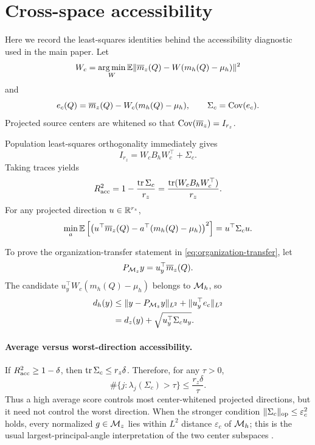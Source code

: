 \section{Cross-space accessibility}\label{app:accessibility}

Here we record the least-squares identities behind the accessibility diagnostic
used in the main paper. Let
\[
W_c
=
\operatorname*{arg\,min}_W
\mathbb{E}\lVert 
\overline m_z(Q)-W(m_h(Q)-\mu_h)
\rVert^2
\]
and
\[
e_c(Q)
=
\overline m_z(Q)-W_c(m_h(Q)-\mu_h),
\qquad
\Sigma_c=\operatorname{Cov}(e_c).
\]
Projected source centers are whitened so that
$\operatorname{Cov}(\overline m_z)=I_{r_z}$.

Population least-squares orthogonality immediately gives
\begin{equation}\label{eq:access-cov-decomp-app}
I_{r_z}
=
W_cB_hW_c^\top+\Sigma_c.
\end{equation}
Taking traces yields
\[
R^2_{\rm acc}
=
1-\frac{\operatorname{tr}\Sigma_c}{r_z}
=
\frac{\operatorname{tr}(W_cB_hW_c^\top)}{r_z}.
\]
For any projected direction $u\in\mathbb{R}^{r_z}$,
\begin{equation}\label{eq:directional-access-app}
\min_a
\mathbb{E}\left[
\left(
u^\top\overline m_z(Q)
-
a^\top(m_h(Q)-\mu_h)
\right)^2
\right]
=
u^\top\Sigma_cu.
\end{equation}

To prove the organization-transfer statement in
\eqref{eq:organization-transfer}, let
\[
P_{\mathcal{M}_z}y=u_y^\top\overline m_z(Q).
\]
The candidate
$u_y^\top W_c(m_h(Q)-\mu_h)$ belongs to $\mathcal{M}_h$, so
\[
\begin{aligned}
d_h(y)
&\le
\lVert y-P_{\mathcal{M}_z}y\rVert_{L^2}
+
\lVert u_y^\top e_c\rVert_{L^2}\\
&=
d_z(y)+\sqrt{u_y^\top\Sigma_cu_y}.
\end{aligned}
\]

\paragraph{Average versus worst-direction accessibility.}
If $R^2_{\rm acc}\ge1-\delta$, then
$\operatorname{tr}\Sigma_c\le r_z\delta$. Therefore, for any $\tau>0$,
\[
\#\{j:\lambda_j(\Sigma_c)>\tau\}
\le
\frac{r_z\delta}{\tau}.
\]
Thus a high average score controls most center-whitened projected directions,
but it need not control the worst direction. When the stronger condition
$\lVert \Sigma_c\rVert_{\rm op}\le\varepsilon_c^2$ holds, every normalized
$g\in\mathcal{M}_z$ lies within $L^2$ distance $\varepsilon_c$ of $\mathcal{M}_h$; this is the
usual largest-principal-angle interpretation of the two center subspaces
\citep{stewart2016cs}.


